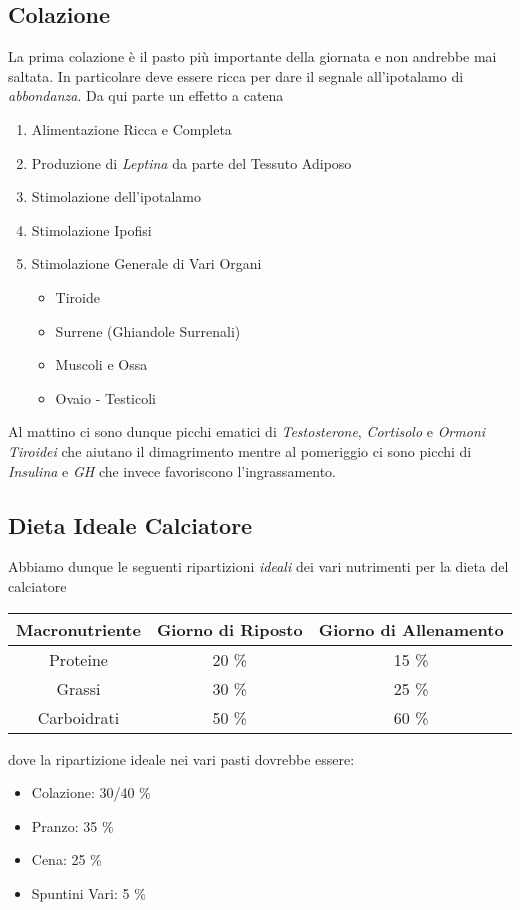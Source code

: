 \documentclass[../uefaC.tex]{subfiles}
\begin{document}
\subsection{Colazione}
La prima colazione è il pasto più importante della giornata e non andrebbe mai saltata. In particolare deve essere ricca per dare il segnale all'ipotalamo di \emph{abbondanza}. Da qui parte un effetto a catena
\begin{enumerate}
    \item Alimentazione Ricca e Completa
    \item Produzione di \emph{Leptina} da parte del Tessuto Adiposo
    \item Stimolazione dell'ipotalamo
    \item Stimolazione Ipofisi
    \item Stimolazione Generale di Vari Organi
    \begin{itemize}
        \item Tiroide
        \item Surrene (Ghiandole Surrenali)
        \item Muscoli e Ossa
        \item Ovaio - Testicoli
    \end{itemize}
\end{enumerate}
Al mattino ci sono dunque picchi ematici di \emph{Testosterone}, \emph{Cortisolo} e \emph{Ormoni Tiroidei} che aiutano il dimagrimento mentre al pomeriggio ci sono picchi di \emph{Insulina} e \emph{GH} che invece favoriscono l'ingrassamento.

\subsection{Dieta Ideale Calciatore}
Abbiamo dunque le seguenti ripartizioni \emph{ideali} dei vari nutrimenti per la dieta del calciatore 

\begin{table}[]
    \begin{tabular}{|c|c|c|}
    \hline
    \textbf{Macronutriente} & \textbf{Giorno di Riposto} & \textbf{Giorno di Allenamento} \\ \hline
    Proteine                & 20 \%                      & 15 \%                          \\ \hline
    Grassi                  & 30 \%                      & 25 \%                          \\ \hline
    Carboidrati             & 50 \%                      & 60 \%                          \\ \hline
    \end{tabular}
\end{table}
dove la ripartizione ideale nei vari pasti dovrebbe essere:
\begin{itemize}
    \item Colazione: 30/40 \%
    \item Pranzo: 35 \%
    \item Cena: 25 \%
    \item Spuntini Vari: 5 \%
\end{itemize}
\end{document}

